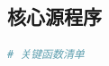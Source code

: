 \subsection{核心源程序}

\begin{lstlisting}[language=Python, basicstyle=\ttfamily\small, breaklines=true]
# 关键函数清单
\end{lstlisting}
